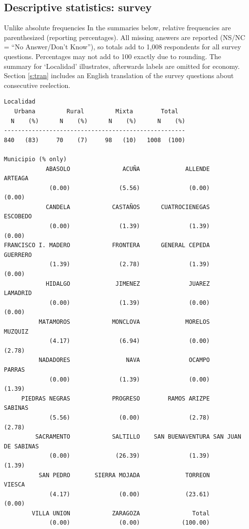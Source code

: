 \documentclass[letter,12pt]{article}
\begin{document}
\subsection{Descriptive statistics: survey}

Unlike absolute frequencies In the summaries below, relative frequencies are parenthesized (reporting percentages). All missing answers are reported (NS/NC = ``No Answer/Don't Know''), so totals add to 1,008 respondents for all survey questions. Percentages may not add to 100 exactly due to rounding. The summary for `Localidad' illustrates, afterwards labels are omitted for economy. Section \ref{s:tran} includes an English translation of the survey questions about consecutive reelection. 

\begin{scriptsize}
\begin{verbatim}
Localidad
   Urbana         Rural         Mixta        Total
  N    (%)      N    (%)      N    (%)      N    (%)
----------------------------------------------------
840   (83)     70    (7)     98   (10)   1008  (100)

Municipio (% only)
            ABASOLO               ACUÑA             ALLENDE             ARTEAGA 
             (0.00)              (5.56)              (0.00)              (0.00) 
            CANDELA            CASTAÑOS      CUATROCIENEGAS            ESCOBEDO 
             (0.00)              (1.39)              (1.39)              (0.00) 
FRANCISCO I. MADERO            FRONTERA      GENERAL CEPEDA            GUERRERO 
             (1.39)              (2.78)              (1.39)              (0.00) 
            HIDALGO             JIMENEZ              JUAREZ            LAMADRID 
             (0.00)              (1.39)              (0.00)              (0.00) 
          MATAMOROS            MONCLOVA             MORELOS             MUZQUIZ 
             (4.17)              (6.94)              (0.00)              (2.78) 
          NADADORES                NAVA              OCAMPO              PARRAS 
             (0.00)              (1.39)              (0.00)              (1.39) 
     PIEDRAS NEGRAS            PROGRESO        RAMOS ARIZPE             SABINAS 
             (5.56)              (0.00)              (2.78)              (2.78) 
         SACRAMENTO            SALTILLO    SAN BUENAVENTURA SAN JUAN DE SABINAS 
             (0.00)             (26.39)              (1.39)              (1.39) 
          SAN PEDRO       SIERRA MOJADA             TORREON              VIESCA 
             (4.17)              (0.00)             (23.61)              (0.00) 
        VILLA UNION            ZARAGOZA               Total
             (0.00)              (0.00)            (100.00)


\end{verbatim}
\end{scriptsize}
\end{document}
